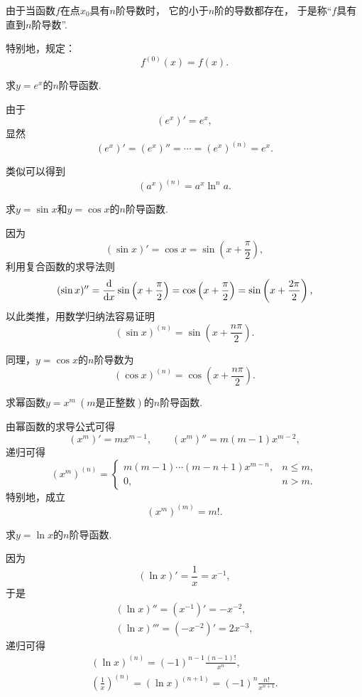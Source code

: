 由于当函数\(f\)在点\(x_0\)具有\(n\)阶导数时，
它的小于\(n\)阶的导数都存在，
于是称“\(f\)具有直到\(n\)阶导数”.

特别地，规定：\[
	f^{(0)}(x) = f(x).
\]

\begin{example}
求\(y = e^x\)的\(n\)阶导函数.
\begin{solution}
由于\[
	(e^x)' = e^x,
\]
显然\[
	(e^x)'
	= (e^x)''
	= \dotsb
	= (e^x)^{(n)}
	= e^x.
\]
\end{solution}
\end{example}
类似可以得到\[
	(a^x)^{(n)}
	= a^x \ln^n a.
\]

\begin{example}
求\(y = \sin x\)和\(y = \cos x\)的\(n\)阶导函数.
\begin{solution}
因为\[
	(\sin x)' = \cos x
	= \sin\left(x + \frac\pi2\right),
\]
利用复合函数的求导法则\[
	(\sin x)'' = \dv{x} \sin\left(x+\frac\pi2\right)
	= \cos\left(x+\frac\pi2\right)
	= \sin\left(x+\frac{2\pi}2\right),
\]
以此类推，用数学归纳法容易证明\[
	(\sin x)^{(n)}
	= \sin\left(x+\frac{n\pi}2\right).
\]
\end{solution}
\end{example}
同理，\(y = \cos x\)的\(n\)阶导数为\[
	(\cos x)^{(n)}
	= \cos\left(x+\frac{n\pi}2\right).
\]

\begin{example}
求幂函数\(y = x^m\ (\text{$m$是正整数})\)的\(n\)阶导函数.
\begin{solution}
由幂函数的求导公式可得\[
	(x^m)' = m x^{m-1},
	\qquad
	(x^m)'' = m(m-1) x^{m-2},
\]
递归可得\begin{equation}
	(x^m)^{(n)} = \left\{ \begin{array}{cl}
		m(m-1)\dotsm(m-n+1) x^{m-n}, & n \leq m, \\
		0, & n > m.
	\end{array} \right.
\end{equation}
特别地，成立\begin{equation}
	(x^m)^{(m)} = m!.
\end{equation}
\end{solution}
\end{example}

\begin{example}
求\(y = \ln x\)的\(n\)阶导函数.
\begin{solution}
因为\[
	(\ln x)' = \frac1x = x^{-1},
\]
于是\begin{gather*}
	(\ln x)'' = (x^{-1})' = -x^{-2}, \\
	(\ln x)''' = (-x^{-2})' = 2x^{-3},
\end{gather*}
递归可得\begin{gather}
	(\ln x)^{(n)}
	= (-1)^{n-1} \frac{(n-1)!}{x^n}, \\
	\left(\frac1x\right)^{(n)}
	= (\ln x)^{(n+1)}
	= (-1)^n \frac{n!}{x^{n+1}}.
\end{gather}
\end{solution}
\end{example}

